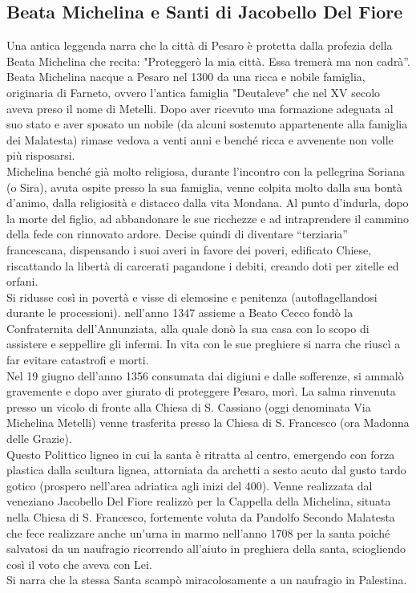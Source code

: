 \documentclass[hidelinks,12pt,a4paper]{article}
\begin{document}
\begin{flushleft}
			\subsection{Beata Michelina e Santi di Jacobello Del Fiore}
			Una antica leggenda narra che la città di Pesaro è protetta dalla profezia della Beata Michelina che recita: "Proteggerò la mia città. Essa tremerà ma non cadrà”.\\
			Beata Michelina nacque a Pesaro nel 1300 da una ricca e nobile famiglia, originaria di Farneto, ovvero l’antica famiglia "Deutaleve" che nel XV secolo aveva preso il nome di Metelli. Dopo aver ricevuto una formazione adeguata al suo stato e aver sposato un nobile (da alcuni sostenuto appartenente alla famiglia dei Malatesta) rimase vedova a venti anni e benché ricca e avvenente non volle più risposarsi.\\
			Michelina benché già molto religiosa, durante l'incontro con la  pellegrina Soriana (o Sira), avuta ospite presso la sua famiglia, venne colpita molto dalla sua bontà d'animo, dalla religiosità e distacco dalla vita Mondana. Al punto d'indurla, dopo la morte del figlio, ad abbandonare le sue ricchezze e ad intraprendere il cammino della fede con rinnovato ardore. Decise quindi di diventare “terziaria” francescana, dispensando i suoi averi in favore dei poveri, edificato Chiese, riscattando la libertà di carcerati pagandone i debiti, creando doti per zitelle ed orfani.\\
			Si ridusse così in povertà e visse di elemosine e penitenza (autoflagellandosi durante le processioni). nell'anno 1347 assieme a Beato Cecco fondò la Confraternita dell'Annunziata, alla quale donò la sua casa con lo scopo di assistere e seppellire gli infermi. In vita con le sue preghiere si narra che riuscì a far evitare catastrofi e morti.\\
			Nel 19 giugno dell'anno 1356 consumata dai digiuni e dalle sofferenze, si ammalò gravemente e dopo aver giurato di proteggere Pesaro, morì. La salma rinvenuta presso un vicolo di fronte alla Chiesa di S. Cassiano (oggi denominata Via Michelina Metelli) venne trasferita presso la Chiesa di S. Francesco (ora Madonna delle Grazie).\\
			Questo Polittico ligneo in cui la santa è ritratta al centro, emergendo con forza plastica dalla scultura lignea, attorniata da archetti a sesto acuto dal gusto tardo gotico (prospero nell'area adriatica agli inizi del 400). Venne realizzata dal veneziano Jacobello Del Fiore realizzò per la Cappella della Michelina, situata nella Chiesa di S. Francesco, fortemente voluta da Pandolfo Secondo Malatesta che fece realizzare anche un'urna in marmo nell'anno 1708 per la santa poiché salvatosi da un naufragio ricorrendo all'aiuto in preghiera della santa, sciogliendo così il voto che aveva con Lei.\\
			Si narra che la stessa Santa scampò miracolosamente a un naufragio in Palestina.
	

\end{flushleft}
\end{document}
